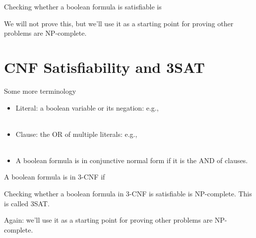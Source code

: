 \documentclass[11  pt]{article}
\begin{document}
	
	\begin{theorem} Checking whether a boolean formula is satisfiable is 
	\end{theorem}
	We will not prove this, but we'll use it as a starting point for proving other problems are NP-complete.
	
	\section{CNF Satisfiability and 3SAT}
	
	Some more terminology
	\begin{itemize}
		\item Literal: a boolean variable or its negation: e.g., \\ \\ 
		\item Clause: the OR of multiple literals: e.g., \\ \\
		\item A boolean formula is in conjunctive normal form if it is the AND of clauses. \\
		
		
	\end{itemize}
	\vs{3cm}
	
	
	A boolean formula is in 3-CNF if 
	
	\vs{5cm}
	
	
	
	\begin{theorem} Checking whether a boolean formula in 3-CNF is satisfiable is NP-complete. This is called 3SAT.
	\end{theorem}
	Again: we'll use it as a starting point for proving other problems are NP-complete.
	
\end{document}
